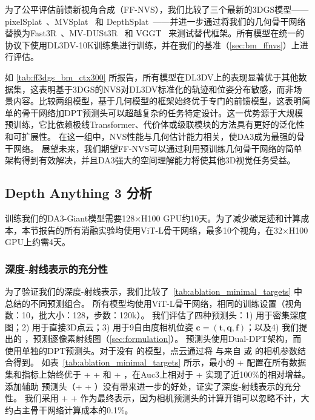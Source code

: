 {为了公平评估前馈新视角合成（FF-NVS），我们比较了三个最新的3DGS模型——pixelSplat~\citep{charatan2024pixelsplat}、MVSplat~\citep{chen2024mvsplat} 和 DepthSplat~\citep{xu2025depthsplat}——并进一步通过将我们的几何骨干网络替换为Fast3R~\citep{yang2025fast3r}、MV-DUSt3R~\citep{Mv-dust3r+} 和 VGGT~\citep{wang2025vggt} 来测试替代框架。所有模型在统一的协议下使用DL3DV-10K训练集进行训练，并在我们的基准（\cref{sec:bm_ffnvs}）上进行评估。

如 \cref{tab:ff3dgs_bm_ctx300} 所报告，所有模型在DL3DV上的表现显著优于其他数据集，这表明基于3DGS的NVS对DL3DV标准化的轨迹和位姿分布敏感，而非场景内容。比较两组模型，基于几何模型的框架始终优于专门的前馈模型，这表明简单的骨干网络加DPT预测头可以超越复杂的任务特定设计。这一优势源于大规模预训练，它比依赖极线Transformer、代价体或级联模块的方法具有更好的泛化性和可扩展性。
在这一组中，NVS性能与几何估计能力相关，使DA3成为最强的骨干网络。
展望未来，我们期望FF-NVS可以通过利用预训练几何骨干网络的简单架构得到有效解决，并且DA3强大的空间理解能力将使其他3D视觉任务受益。

\subsection{Depth Anything 3 分析}
训练我们的DA3-Giant模型需要128$\times$H100 GPU约10天。为了减少碳足迹和计算成本，本节报告的所有消融实验均使用ViT-L骨干网络，最多10个视角，在32$\times$H100 GPU上约需4天。



\subsubsection{深度-射线表示的充分性}

为了验证我们的深度-射线表示，我们比较了~\cref{tab:ablation_minimal_targets} 中总结的不同预测组合。
所有模型均使用ViT-L骨干网络，相同的训练设置（视角数：10，批大小：128，步数：120k）。
我们评估了四种预测头：1) \textbf{\depth} 用于密集深度图；2) \textbf{\pcd} 用于直接3D点云；3) \textbf{\cam} 用于9自由度相机位姿 $\mathbf{c}=(\mathbf{t}, \mathbf{q}, \mathbf{f})$；以及4) 我们提出的 \textbf{\ray}，预测逐像素射线图（\cref{sec:formulation}）。
\ray 预测头使用Dual-DPT架构，而 \pcd 使用单独的DPT预测头。对于没有 \pcd 的模型，点云通过将 \depth 与来自 \ray 或 \cam 的相机参数结合得到。
如表~\ref{tab:ablation_minimal_targets} 所示，最小的 \depth + \ray 配置在所有数据集和指标上始终优于 \depth + \pcd + \cam 和 \depth + \cam，在Auc3上相对于 \depth + \cam 实现了近100\%的相对增益。
添加辅助 \cam 预测头（\depth + \ray + \cam）没有带来进一步的好处，证实了深度-射线表示的充分性。
我们采用 \depth + \ray + \cam 作为最终表示，因为相机预测头的计算开销可以忽略不计，大约占主骨干网络计算成本的0.1\%。

}
